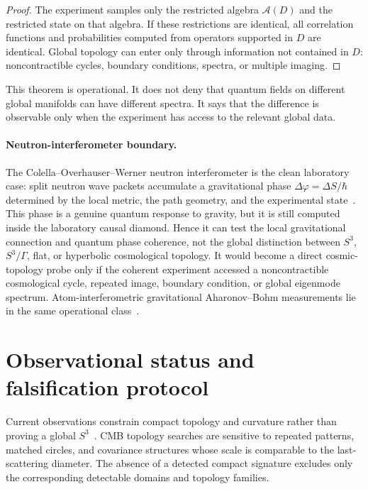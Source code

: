 \documentclass[
  aps,
  prd,
  reprint,
  superscriptaddress,
  floatfix,
  nofootinbib,
  longbibliography
]{revtex4-2}
\theoremstyle{plain}
\theoremstyle{definition}
\theoremstyle{remark}
\begin{document}
\begin{proof}
The experiment samples only the restricted algebra \(\mathcal A(D)\) and the restricted state on that algebra.  If these restrictions are identical, all correlation functions and probabilities computed from operators supported in \(D\) are identical.  Global topology can enter only through information not contained in \(D\): noncontractible cycles, boundary conditions, spectra, or multiple imaging.
\end{proof}

This theorem is operational.  It does not deny that quantum fields on different global manifolds can have different spectra.  It says that the difference is observable only when the experiment has access to the relevant global data.

\paragraph*{Neutron-interferometer boundary.}
The Colella--Overhauser--Werner neutron interferometer is the clean laboratory
case: split neutron wave packets accumulate a gravitational phase
\(\Delta\varphi=\Delta S/\hbar\) determined by the local metric, the path
geometry, and the experimental state~\cite{COW}.  This phase is a genuine
quantum response to gravity, but it is still computed inside the laboratory
causal diamond.  Hence it can test the local gravitational connection and
quantum phase coherence, not the global distinction between \(S^3\),
\(S^3/\Gamma\), flat, or hyperbolic cosmological topology.  It would become
a direct cosmic-topology probe only if the coherent experiment accessed a
noncontractible cosmological cycle, repeated image, boundary condition, or
global eigenmode spectrum.  Atom-interferometric gravitational
Aharonov--Bohm measurements lie in the same operational class~\cite{Overstreet}.

\section{Observational status and falsification protocol}

Current observations constrain compact topology and curvature rather than proving
a global \(S^3\)~\cite{Cornish,PlanckTopology,SahaLens,Planck2018,DESIDR2}.
CMB topology searches are sensitive to repeated patterns, matched circles, and
covariance structures whose scale is comparable to the last-scattering diameter.
The absence of a detected compact signature excludes only the corresponding
detectable domains and topology families.
\end{document}
